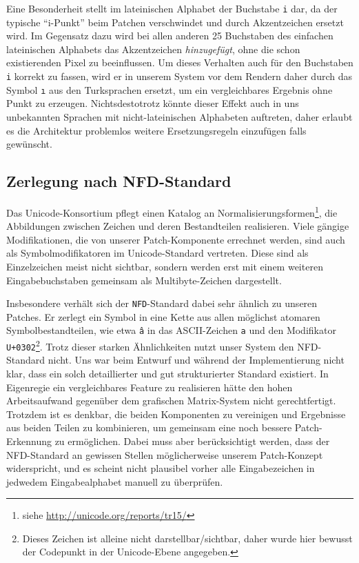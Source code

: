 \documentclass[11pt,a4paper]{article}
\begin{document}
Eine Besonderheit stellt im lateinischen Alphabet der Buchstabe \texttt{i} dar, da der typische \enquote{i-Punkt} beim Patchen verschwindet und durch Akzentzeichen ersetzt wird. Im Gegensatz dazu wird bei allen anderen 25 Buchstaben des einfachen lateinischen Alphabets das Akzentzeichen \textit{hinzugefügt}, ohne die schon existierenden Pixel zu beeinflussen. Um dieses Verhalten auch für den Buchstaben \texttt{i} korrekt zu fassen, wird er in unserem System vor dem Rendern daher durch das Symbol \texttt{ı} aus den Turksprachen ersetzt, um ein vergleichbares Ergebnis ohne Punkt zu erzeugen. Nichtsdestotrotz könnte dieser Effekt auch in uns unbekannten Sprachen mit nicht-lateinischen Alphabeten auftreten, daher erlaubt es die Architektur problemlos weitere Ersetzungsregeln einzufügen falls gewünscht.

\subsection{Zerlegung nach NFD-Standard}
\label{sec:nfd}
Das Unicode-Konsortium pflegt einen Katalog an Normalisierungsformen\footnote{siehe \url{http://unicode.org/reports/tr15/}}, die Abbildungen zwischen Zeichen und deren Bestandteilen realisieren. Viele gängige Modifikationen, die von unserer Patch-Komponente errechnet werden, sind auch als Symbolmodifikatoren im Unicode-Standard vertreten. Diese sind als Einzelzeichen meist nicht sichtbar, sondern werden erst mit einem weiteren Eingabebuchstaben gemeinsam als Multibyte-Zeichen dargestellt.

Insbesondere verhält sich der \texttt{NFD}-Standard dabei sehr ähnlich zu unseren Patches. Er zerlegt ein Symbol in eine Kette aus allen möglichst atomaren Symbolbestandteilen, wie etwa \texttt{â} in das ASCII-Zeichen \texttt{a} und den Modifikator \texttt{U+0302}\footnote{Dieses Zeichen ist alleine nicht darstellbar/sichtbar, daher wurde hier bewusst der Codepunkt in der Unicode-Ebene angegeben.}.
Trotz dieser starken Ähnlichkeiten nutzt unser System den NFD-Standard nicht. Uns war beim Entwurf und während der Implementierung nicht klar, dass ein solch detaillierter und gut strukturierter Standard existiert. In Eigenregie ein vergleichbares Feature zu realisieren hätte den hohen Arbeitsaufwand gegenüber dem grafischen Matrix-System nicht gerechtfertigt. Trotzdem ist es denkbar, die beiden Komponenten zu vereinigen und Ergebnisse aus beiden Teilen zu kombinieren, um gemeinsam eine noch bessere Patch-Erkennung zu ermöglichen. Dabei muss aber berücksichtigt werden, dass der NFD-Standard an gewissen Stellen möglicherweise unserem Patch-Konzept widerspricht, und es scheint nicht plausibel vorher alle Eingabezeichen in jedwedem Eingabealphabet manuell zu überprüfen.
\end{document}
